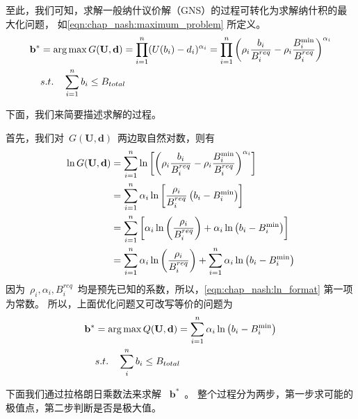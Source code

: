 至此，我们可知，求解一般纳什议价解（GNS）的过程可转化为求解纳什积的最大化问题，
如\eqref{eqn:chap_nash:maximum_problem} 所定义。
\begin{align}
    \mathbf{b}^* &= \arg \max G(\mathbf{U}, \mathbf{d}) = \prod_{i=1}^n (U(b_i) - d_i)^{\alpha_i} = \prod_{i=1}^{n} \left(\rho_i \frac{b_i}{B_i^{req}} - \rho_i \frac{B_i^{\min}}{B_i^{req}} \right)^{\alpha_i} \notag\\
    & s.t. \quad \sum_{i=1}^n b_i \le B_{total} 
    \label{eqn:chap_nash:maximum_problem}
\end{align}


下面，我们来简要描述求解的过程。

首先，我们对~$G(\mathbf{U}, \mathbf{d})$~两边取自然对数，则有
\begin{align}
    \ln G(\mathbf{U}, \mathbf{d}) &= \sum_{i=1}^{n} \ln \left[ \left(\rho_i \frac{b_i}{B_i^{req}} - \rho_i \frac{B_i^{\min}}{B_i^{req}} \right)^{\alpha_i} \right] \notag \notag\\
    &= \sum_{i=1}^{n} \alpha_i\ln \left[ \frac{\rho_i}{B_i^{req}} \left( b_i - B_i^{\min} \right) \right] \notag \\
    &= \sum_{i=1}^n \left[ \alpha_i \ln \left( \frac{\rho_i}{B_i^{req}} \right) + \alpha_i \ln \left( b_i - B_i^{\min} \right) \right] \notag\\
    &= \sum_{i=1}^n \alpha_i \ln \left( \frac{\rho_i}{B_i^{req}} \right) + \sum_{i=1}^n  \alpha_i \ln \left(b_i - B_i^{\min} \right) 
    \label{eqn:chap_nash:ln_format}
\end{align}
因为~$\rho_i, \alpha_i, B_i^{req}$~均是预先已知的系数，所以，\eqref{eqn:chap_nash:ln_format} 第一项为常数。
所以，上面优化问题又可改写等价的问题为
\begin{align}
    \mathbf{b}^* &= \arg \max Q(\mathbf{U}, \mathbf{d}) = \sum_{i=1}^n  \alpha_i \ln \left( b_i - B_i^{\min} \right) \notag\\
    & s.t. \quad \sum_i^n b_i \le B_{total} 
\end{align}

下面我们通过拉格朗日乘数法来求解 ~$\mathbf{b}^*$~。
整个过程分为两步，第一步求可能的极值点，第二步判断是否是极大值。

